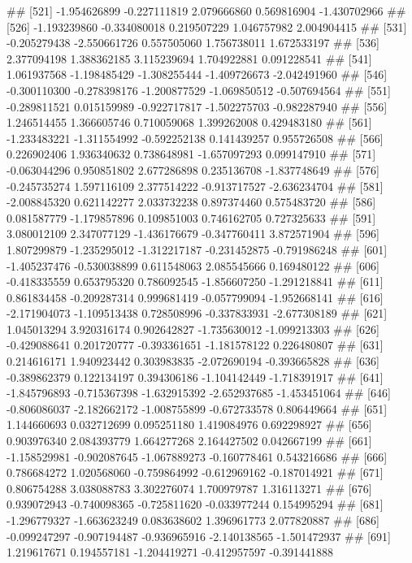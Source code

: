 \documentclass[
]{article}
\begin{document}
\begin{enumerate}[label=(\alph*)]
##  [521] -1.954626899 -0.227111819  2.079666860  0.569816904 -1.430702966
##  [526] -1.193239860 -0.334080018  0.219507229  1.046757982  2.004904415
##  [531] -0.205279438 -2.550661726  0.557505060  1.756738011  1.672533197
##  [536]  2.377094198  1.388362185  3.115239694  1.704922881  0.091228541
##  [541]  1.061937568 -1.198485429 -1.308255444 -1.409726673 -2.042491960
##  [546] -0.300110300 -0.278398176 -1.200877529 -1.069850512 -0.507694564
##  [551] -0.289811521  0.015159989 -0.922717817 -1.502275703 -0.982287940
##  [556]  1.246514455  1.366605746  0.710059068  1.399262008  0.429483180
##  [561] -1.233483221 -1.311554992 -0.592252138  0.141439257  0.955726508
##  [566]  0.226902406  1.936340632  0.738648981 -1.657097293  0.099147910
##  [571] -0.063044296  0.950851802  2.677286898  0.235136708 -1.837748649
##  [576] -0.245735274  1.597116109  2.377514222 -0.913717527 -2.636234704
##  [581] -2.008845320  0.621142277  2.033732238  0.897374460  0.575483720
##  [586]  0.081587779 -1.179857896  0.109851003  0.746162705  0.727325633
##  [591]  3.080012109  2.347077129 -1.436176679 -0.347760411  3.872571904
##  [596]  1.807299879 -1.235295012 -1.312217187 -0.231452875 -0.791986248
##  [601] -1.405237476 -0.530038899  0.611548063  2.085545666  0.169480122
##  [606] -0.418335559  0.653795320  0.786092545 -1.856607250 -1.291218841
##  [611]  0.861834458 -0.209287314  0.999681419 -0.057799094 -1.952668141
##  [616] -2.171904073 -1.109513438  0.728508996 -0.337833931 -2.677308189
##  [621]  1.045013294  3.920316174  0.902642827 -1.735630012 -1.099213303
##  [626] -0.429088641  0.201720777 -0.393361651 -1.181578122  0.226480807
##  [631]  0.214616171  1.940923442  0.303983835 -2.072690194 -0.393665828
##  [636] -0.389862379  0.122134197  0.394306186 -1.104142449 -1.718391917
##  [641] -1.845796893 -0.715367398 -1.632915392 -2.652937685 -1.453451064
##  [646] -0.806086037 -2.182662172 -1.008755899 -0.672733578  0.806449664
##  [651]  1.144660693  0.032712699  0.095251180  1.419084976  0.692298927
##  [656]  0.903976340  2.084393779  1.664277268  2.164427502  0.042667199
##  [661] -1.158529981 -0.902087645 -1.067889273 -0.160778461  0.543216686
##  [666]  0.786684272  1.020568060 -0.759864992 -0.612969162 -0.187014921
##  [671]  0.806754288  3.038088783  3.302276074  1.700979787  1.316113271
##  [676]  0.939072943 -0.740098365 -0.725811620 -0.033977244  0.154995294
##  [681] -1.296779327 -1.663623249  0.083638602  1.396961773  2.077820887
##  [686] -0.099247297 -0.907194487 -0.936965916 -2.140138565 -1.501472937
##  [691]  1.219617671  0.194557181 -1.204419271 -0.412957597 -0.391441888

\end{enumerate}
\end{document}
